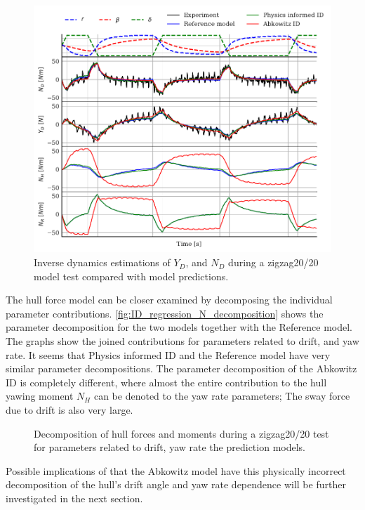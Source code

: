 \begin{figure}[h]
    \centering
    \includegraphics[width=\columnwidth]{figures/results.ID_zigzag20.pdf}
    \caption{Inverse dynamics estimations of $Y_D$, and $N_D$ during a zigzag20/20 model test compared with model predictions.}
    \label{fig:ID_zigzag20}
\end{figure}

The hull force model can be closer examined by decomposing the individual parameter contributions. \autoref{fig:ID_regression_N_decomposition} shows the parameter decomposition for the two models together with the Reference model. The graphs show the joined contributions for parameters related to drift, and yaw rate. It seems that Physics informed ID and the Reference model have very similar parameter decompositions.
The parameter decomposition of the Abkowitz ID is completely different, where almost the entire contribution to the hull yawing moment $N_H$ can be denoted to the yaw rate parameters; The sway force due to drift is also very large.  
\begin{figure}[h]
    \begin{center}
        
        \caption{Decomposition of hull forces and moments during a zigzag20/20 test for parameters related to drift, yaw rate the prediction models.}
        \label{fig:ID_regression_N_decomposition}
    \end{center}
\end{figure}
Possible implications of that the Abkowitz model have this physically incorrect decomposition of the hull's drift angle and yaw rate dependence will be further investigated in the next section.